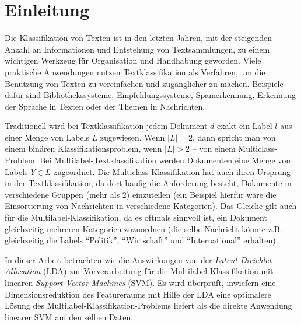 \section{Einleitung}

\begin{comment}
Einführung und Einbettung des Problems
Was ist die konkrete Problemstellung / Fragestellung der Arbeit
Literature Review
\end{comment}

Die Klassifikation von Texten ist in den letzten Jahren, mit der steigenden Anzahl an Informationen und Entstehung von Textsammlungen, zu einem wichtigen Werkzeug für Organisation und Handhabung geworden.
Viele praktische Anwendungen nutzen Textklassifikation als Verfahren, um die Benutzung von Texten zu vereinfachen und zugänglicher zu machen.
Beispiele dafür sind Bibliothekssysteme, Empfehlungssysteme, Spamerkennung, Erkennung der Sprache in Texten oder der Themen in Nachrichten.

Traditionell wird bei Textklassifikation jedem Dokument $d$ exakt ein Label $l$ aus einer Menge von Labels $L$ zugewiesen.
Wenn $|L| = 2$, dann spricht man von einem binären Klassifikationsproblem, wenn $|L| > 2$ -- von einem Multiclass-Problem.
Bei Multilabel-Textklassifikation werden Dokumenten eine Menge von Labels $Y \in L$ zugeordnet.
Die Multiclass-Klassifikation hat auch ihren Ursprung in der Textklassifikation, da dort häufig die Anforderung besteht, Dokumente in verschiedene Gruppen (mehr als 2) einzuteilen (ein Beispiel hierfür wäre die Einsortierung von Nachrichten in verschiedene Kategorien).
Das Gleiche gilt auch für die Multilabel-Klassifikation, da es oftmals sinnvoll ist, ein Dokument gleichzeitig mehreren Kategorien zuzuordnen (die selbe Nachricht könnte z.B. gleichzeitig die Labels ``Politik'', ``Wirtschaft'' und ``International'' erhalten).

In dieser Arbeit betrachten wir die Auswirkungen von der \emph{Latent Dirichlet Allocation} (LDA) zur Vorverarbeitung für die Multilabel-Klassifikation mit linearen \emph{Support Vector Machines} (SVM).
Es wird überprüft, inwiefern eine Dimensionsreduktion des Featureraums mit Hilfe der LDA eine optimalere Lösung des Multilabel-Klassifikation-Problems liefert als die direkte Anwendung linearer SVM auf den selben Daten.

